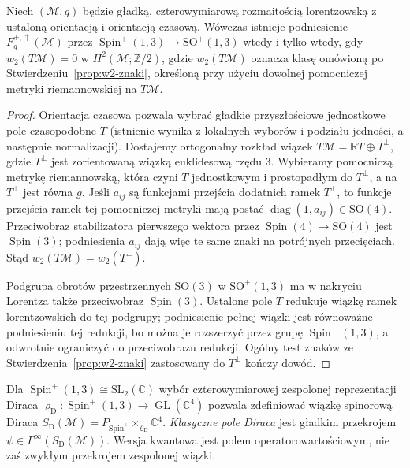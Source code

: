 \begin{stwierdzenie}
\label{prop:spin-lorentz-kryterium}
Niech $(\mathcal M,g)$ będzie gładką,
czterowymiarową rozmaitością lorentzowską
z ustaloną orientacją i orientacją czasową.
Wówczas istnieje podniesienie
$F^{+,\uparrow}_g(\mathcal M)$ przez
$\operatorname{Spin}^+(1,3)\to\mathrm{SO}^+(1,3)$
wtedy i tylko wtedy, gdy
$w_2(T\mathcal M)=0$ w $H^2(\mathcal M;\mathbb Z/2)$,
gdzie $w_2(T\mathcal M)$ oznacza klasę omówioną po
Stwierdzeniu~\ref{prop:w2-znaki}, określoną przy użyciu
dowolnej pomocniczej metryki riemannowskiej na $T\mathcal M$.
\end{stwierdzenie}
\begin{proof}
Orientacja czasowa pozwala wybrać gładkie
przyszłościowe jednostkowe pole czasopodobne $T$
(istnienie wynika z lokalnych wyborów i podziału
jedności, a następnie normalizacji). Dostajemy
ortogonalny rozkład wiązek
$T\mathcal M=\mathbb RT\oplus T^\perp$,
gdzie $T^\perp$ jest zorientowaną wiązką euklidesową
rzędu $3$. Wybieramy pomocniczą metrykę riemannowską,
która czyni $T$ jednostkowym i prostopadłym do $T^\perp$,
a na $T^\perp$ jest równa $g$. Jeśli $a_{ij}$ są funkcjami
przejścia dodatnich ramek $T^\perp$, to funkcje przejścia
ramek tej pomocniczej metryki mają postać
$\operatorname{diag}(1,a_{ij})\in\mathrm{SO}(4)$.
Przeciwobraz stabilizatora pierwszego wektora przez
$\operatorname{Spin}(4)\to\mathrm{SO}(4)$ jest
$\operatorname{Spin}(3)$; podniesienia $a_{ij}$ dają
więc te same znaki na potrójnych przecięciach.
Stąd $w_2(T\mathcal M)=w_2(T^\perp)$.

Podgrupa obrotów przestrzennych $\mathrm{SO}(3)$
w $\mathrm{SO}^+(1,3)$ ma w nakryciu Lorentza także
przeciwobraz $\operatorname{Spin}(3)$. Ustalone pole $T$
redukuje wiązkę ramek lorentzowskich do tej podgrupy;
podniesienie pełnej wiązki jest równoważne podniesieniu
tej redukcji, bo można je rozszerzyć przez grupę
$\operatorname{Spin}^+(1,3)$, a odwrotnie ograniczyć
do przeciwobrazu redukcji. Ogólny test znaków ze
Stwierdzenia~\ref{prop:w2-znaki} zastosowany do
$T^\perp$ kończy dowód.
\end{proof}

Dla $\operatorname{Spin}^+(1,3)\cong\mathrm{SL}_2(\mathbb C)$
wybór czterowymiarowej zespolonej reprezentacji Diraca
$\varrho_{\mathrm D}:\operatorname{Spin}^+(1,3)
\to\operatorname{GL}(\mathbb C^4)$ pozwala zdefiniować
wiązkę spinorową Diraca
$S_{\mathrm D}(\mathcal M)
=P_{\operatorname{Spin}^+}\times_{\varrho_{\mathrm D}}\mathbb C^4$.
\emph{Klasyczne pole Diraca} jest gładkim przekrojem
$\psi\in\Gamma^\infty(S_{\mathrm D}(\mathcal M))$.
Wersja kwantowa jest polem operatorowartościowym,
nie zaś zwykłym przekrojem zespolonej wiązki.

